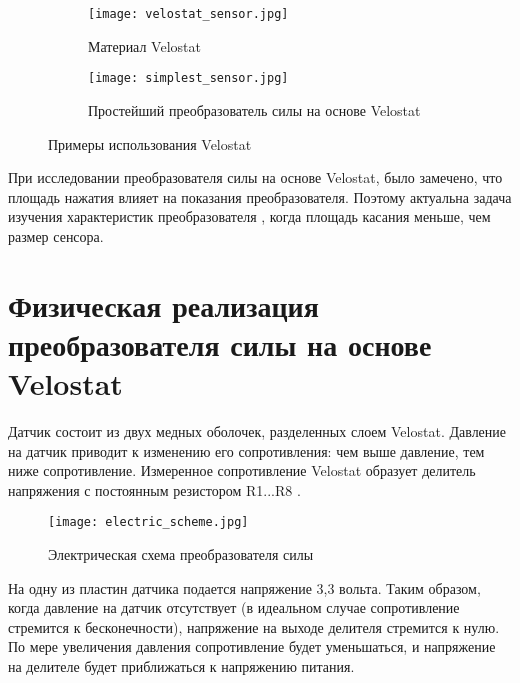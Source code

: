\begin{figure}[H]
    \begin{subfigure}[t]{0.9\textwidth}
        \centering\texttt{[image: velostat\_sensor.jpg]}
        \caption{Материал Velostat}
        \label{fig:velostat_sensor.jpg}
    \end{subfigure}

    \begin{subfigure}[t]{0.95\textwidth}
        \centering\texttt{[image: simplest\_sensor.jpg]}
        \caption{Простейший преобразователь силы на основе Velostat}
        \label{fig:simplest_sensor.jpg}
    \end{subfigure}
    \caption{Примеры использования Velostat}
\end{figure}

При исследовании преобразователя силы на основе Velostat, было замечено, что площадь нажатия влияет на показания преобразователя. Поэтому актуальна задача изучения характеристик преобразователя , когда площадь касания меньше, чем размер сенсора.

\section{Физическая реализация преобразователя силы на основе Velostat}

Датчик состоит из двух медных оболочек, разделенных слоем Velostat. Давление на датчик приводит к изменению его сопротивления: чем выше давление, тем ниже сопротивление. Измеренное сопротивление Velostat образует делитель напряжения с постоянным резистором R1...R8 .


\begin{figure}[H]
\centering\texttt{[image: electric\_scheme.jpg]}\\
\caption{Электрическая схема преобразователя силы}
\label{fig:el_scheme}
\end{figure}

На одну из пластин датчика подается напряжение 3,3 вольта. Таким образом, когда давление на датчик отсутствует (в идеальном случае сопротивление стремится к бесконечности), напряжение на выходе делителя стремится к нулю. По мере увеличения давления сопротивление будет уменьшаться, и напряжение на делителе будет приближаться к напряжению питания.

